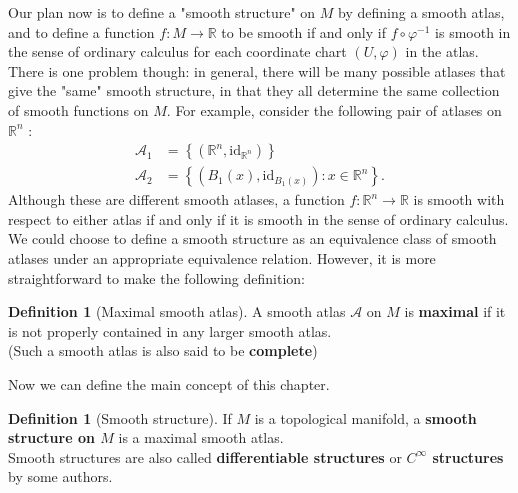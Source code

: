 \documentclass[reqno]{amsart}
\theoremstyle{plain}%
\theoremstyle{definition}
\newtheorem{definition}[theorem]{Definition}
\theoremstyle{remark}
\newcommand{\id}{{\mathrm{id}}}
\begin{document}
            Our plan now is to define a "smooth structure" on $M$ by defining a smooth
            atlas, and to define a function $f  \colon M \to \mathbb{R}$ to be smooth if
            and only if $f \circ \varphi^{-1}$ is smooth in the sense of ordinary calculus
            for each coordinate chart $\left( U, \varphi \right) $ in the atlas.
            There is one problem though: in general, there will be many possible atlases
            that give the "same" smooth structure, in that they all determine the same
            collection of smooth functions on $M$. For example, consider the following pair
            of atlases on $\mathbb{R}^{n}$ :
                \begin{align*}
                \mathcal{A}_1 &= \left\{ \left( \mathbb{R}^{n}, \id_{\mathbb{R}^{n}}
                \right)  \right\} \\
                        \mathcal{A}_2 &=
                        \left\{ \left( B_1 (x), \id_{B_1(x)} \right)  \colon
                        x \in  \mathbb{R}^{n} \right\}.
            \end{align*}
            Although these are different smooth atlases, a function
            $f  \colon \mathbb{R}^{n} \to \mathbb{R}$ is smooth with respect to either
            atlas if and only if it is smooth in the sense of ordinary calculus.\\
            \linebreak
            We could choose to define a smooth structure as an equivalence class of smooth
            atlases under an appropriate equivalence relation. However, it is more
            straightforward to make the following definition:

            \begin{definition}[Maximal smooth atlas]
            A smooth atlas $\mathcal{A}$ on $M$ is \textbf{maximal} if it is not
            properly contained in any larger smooth atlas.\\
            (Such a smooth atlas is also said to be \textbf{complete})
            \end{definition}
            Now we can define the main concept of this chapter.

            \begin{definition}[Smooth structure]
            If $M$ is a topological manifold, a \textbf{smooth structure on $M$} is
            a maximal smooth atlas.\\
            Smooth structures are also called \textbf{differentiable structures} or
            \textbf{$C^{\infty}$ structures} by some authors.
            \end{definition}
\end{document}
